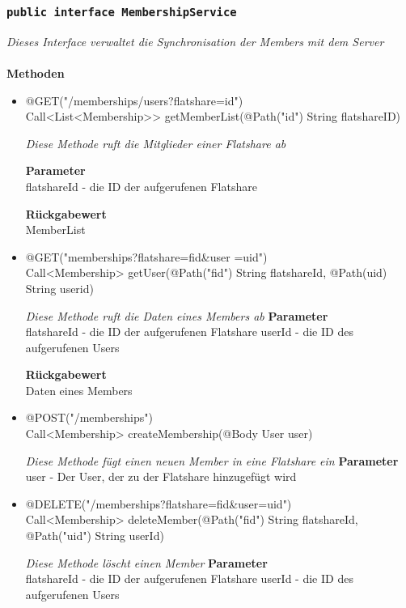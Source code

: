 	\subsubsection{\texttt{public interface MembershipService }}
\textit{Dieses Interface verwaltet die Synchronisation der Members mit dem Server}\\
\\
	\textbf{Methoden} \\
		\begin{itemize}
		\item{@GET("/memberships/users?flatshare={id}") \\ Call<List<Membership>> getMemberList(@Path("id") String flatshareID)}

		\textit{Diese Methode ruft die Mitglieder einer Flatshare ab}

		\textbf{Parameter} \\
	flatshareId - die ID der aufgerufenen Flatshare  

		\textbf{Rückgabewert} \\
	MemberList

      \item{@GET("memberships?flatshare={fid}\&user ={uid}")\\Call<Membership> getUser(@Path("fid") String flatshareId, @Path(\grqq uid\grqq) String userid)}

		\textit{Diese Methode ruft die Daten eines Members ab}        	
		\textbf{Parameter} \\
		flatshareId - die ID der aufgerufenen Flatshare 
		userId - die ID des aufgerufenen Users

		\textbf{Rückgabewert} \\
      Daten eines Members


      \item{@POST("/memberships")\\ Call<Membership> createMembership(@Body User user)}

		\textit{Diese Methode fügt einen neuen Member in eine Flatshare ein}        	
		\textbf{Parameter} \\
		user - Der User, der zu der Flatshare hinzugefügt wird 

	      \item{@DELETE("/memberships?flatshare={fid}\&user={uid}")\\Call<Membership> deleteMember(@Path("fid") String flatshareId, @Path("uid") String userId)}

		\textit{Diese Methode löscht einen Member}        	
		\textbf{Parameter} \\
		flatshareId - die ID der aufgerufenen Flatshare 
		userId - die ID des aufgerufenen Users


	 \end{itemize}

